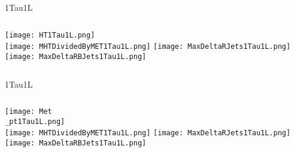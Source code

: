 \documentclass{beamer}
\begin{document}
\begin{frame}{1Tau1L}
    \begin{columns}[t]
    \centering
    \texttt{[image: HT1Tau1L.png]}\\
    \texttt{[image: MHTDividedByMET1Tau1L.png]}
    \centering
    \texttt{[image: MaxDeltaRJets1Tau1L.png]}\\
    \texttt{[image: MaxDeltaRBJets1Tau1L.png]}
    \end{columns}
\end{frame}
\begin{frame}{1Tau1L}
    \begin{columns}[t]
    \centering
    \texttt{[image: Met\\\_pt1Tau1L.png]}\\%
    \texttt{[image: MHTDividedByMET1Tau1L.png]}
    \centering
    \texttt{[image: MaxDeltaRJets1Tau1L.png]}\\
    \texttt{[image: MaxDeltaRBJets1Tau1L.png]}
    \end{columns}
\end{frame}
\end{document}
